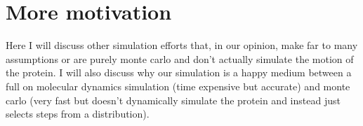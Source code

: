 \section{More motivation} 
Here I will discuss other simulation efforts that, in our opinion, make far to many assumptions or are purely monte carlo and don't actually simulate the motion of the protein. I will also discuss why our simulation is a happy medium between a full on molecular dynamics simulation (time expensive but accurate) and monte carlo (very fast but doesn't dynamically simulate the protein and instead just selects steps from a distribution). 